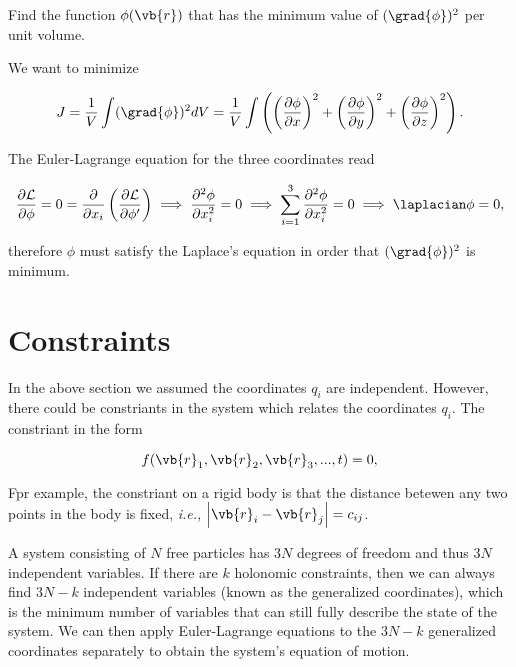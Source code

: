 \documentclass[a4paper,12pt]{report}
\begin{document}
{Find the function \(\phi (\vb{r} )\) that has the minimum value of \((\grad{\phi })^2\) per unit volume.  }
{We want to minimize 

\begin{equation}
	J = \frac{1}{V} \int (\grad{\phi } )^2 dV = \frac{1}{V} \int \left( \left( \frac{\partial \phi }{\partial x}  \right)^2 + \left( \frac{\partial \phi }{\partial y}  \right)^2 + \left( \frac{\partial \phi }{\partial z}  \right)^2 \right).
\end{equation}

The Euler-Lagrange equation for the three coordinates read

\begin{equation}
	\frac{\partial \mathcal{L}}{\partial \phi } = 0 = \frac{\partial }{\partial x_{i} } \left( \frac{\partial \mathcal{L}}{\partial \phi '}  \right) \implies \frac{\partial^2 \phi }{\partial x_{i} ^2} = 0 \implies \sum_{i=1}^{3} \frac{\partial^2 \phi }{\partial x_{i} ^2} = 0 \implies \laplacian \phi =0,
\end{equation}

therefore \(\phi \) must satisfy the Laplace's equation in order that \((\grad{\phi } )^2\) is minimum.  


} 

\section{Constraints} \label{constraints} 
In the above section we assumed the coordinates \(q_{i} \) are independent. However, there could be constriants in the system which relates the coordinates \(q_{i} \). The constriant in the form

\begin{equation}
	f(\vb{r} _{1} , \vb{r} _{2} , \vb{r} _{3} , ..., t) = 0,
\end{equation}

Fpr example, the constriant on a rigid body is that the distance betewen any two points in the body is fixed, \textit{i.e.,} \(	\left| \vb{r} _{i} - \vb{r} _{j}  \right| = c_{ij} \).  

A system consisting of \(N\) free particles has \(3N\) degrees of freedom and thus \(3N\) independent variables. If there are \(k\) holonomic constraints, then we can always find \(3N-k\) independent variables (known as the generalized coordinates), which is the minimum number of variables that can still fully describe the state of the system. We can then apply Euler-Lagrange equations to the \(3N-k\) generalized coordinates separately to obtain the system's equation of motion. 
\end{document}
